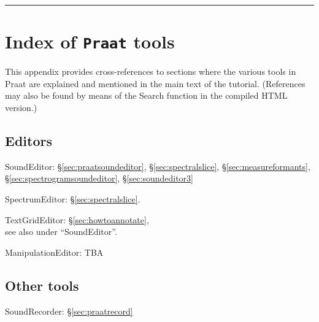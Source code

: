 \documentclass[
]{book}
\begin{document}
\begin{center}\rule{0.5\linewidth}{0.5pt}\end{center}

\chapter{\texorpdfstring{Index of \texttt{Praat} tools}{Index of Praat tools}}\label{app-praattools}

This appendix provides cross-references to sections where the various tools in Praat are explained and mentioned in the main text of the tutorial. (References may also be found by means of the Search function in the compiled HTML version.)

\section{Editors}\label{editors}

SoundEditor:
§\ref{sec:praatsoundeditor},
§\ref{sec:spectralslice},
§\ref{sec:measureformants},
§\ref{sec:spectrogramsoundeditor},
§\ref{sec:soundeditor3}

SpectrumEditor:
§\ref{sec:spectralslice}.

TextGridEditor:
§\ref{sec:howtoannotate},\\
see also under ``SoundEditor''.

ManipulationEditor:
TBA

\section{Other tools}\label{other-tools}

SoundRecorder:
§\ref{sec:praatrecord}

  
\end{document}
